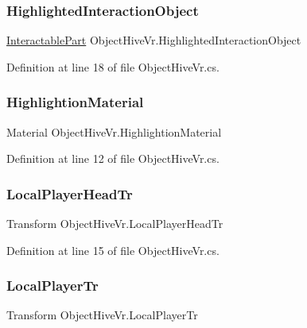 \subsubsection{\texorpdfstring{HighlightedInteractionObject}{HighlightedInteractionObject}}
{\footnotesize\ttfamily \mbox{\hyperlink{class_interactable_part}{Interactable\+Part}} Object\+Hive\+Vr.\+Highlighted\+Interaction\+Object}



Definition at line 18 of file Object\+Hive\+Vr.\+cs.

\mbox{\label{class_object_hive_vr_a2f65eda8022673c0c981ed7f48d93594}} 
\subsubsection{\texorpdfstring{HighlightionMaterial}{HighlightionMaterial}}
{\footnotesize\ttfamily Material Object\+Hive\+Vr.\+Highlightion\+Material}



Definition at line 12 of file Object\+Hive\+Vr.\+cs.

\mbox{\label{class_object_hive_vr_a0cf0a7285ce568891bcabe852acb0e87}} 
\subsubsection{\texorpdfstring{LocalPlayerHeadTr}{LocalPlayerHeadTr}}
{\footnotesize\ttfamily Transform Object\+Hive\+Vr.\+Local\+Player\+Head\+Tr}



Definition at line 15 of file Object\+Hive\+Vr.\+cs.

\mbox{\label{class_object_hive_vr_aa00f4426f67a08ebb7ae7a46b122d7f1}} 
\subsubsection{\texorpdfstring{LocalPlayerTr}{LocalPlayerTr}}
{\footnotesize\ttfamily Transform Object\+Hive\+Vr.\+Local\+Player\+Tr}



